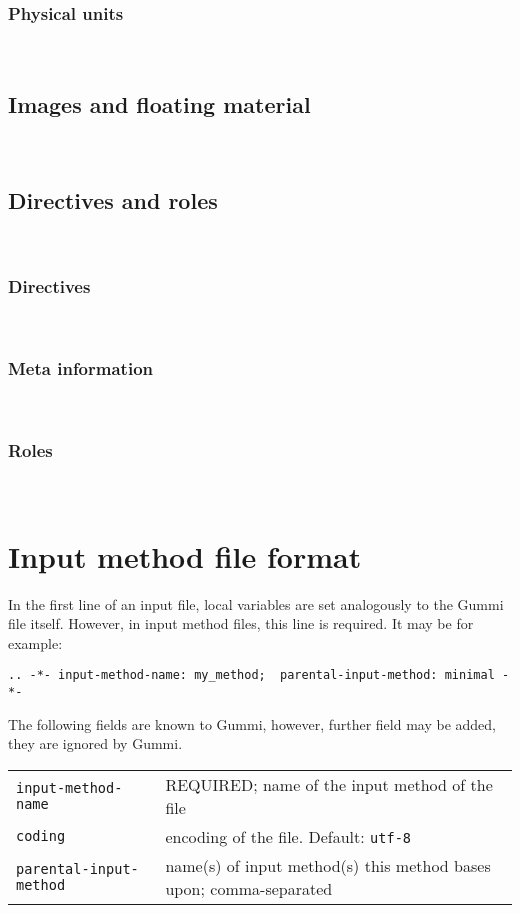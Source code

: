 \documentclass[12pt,openany]{book}
\begin{document}
~


\subsubsection{Physical units}

~

\subsection{Images and floating material}


~

\subsection{Directives and roles}

~

\subsubsection{Directives}

~

\subsubsection{Meta information}

~

\subsubsection{Roles}

~


\section{Input method file format}

In the first line of an input file, local variables are set analogously to the
Gummi file itself.  However, in input method files, this line is required.  It
may be for example:

\begin{lstlisting}
.. -*- input-method-name: my_method;  parental-input-method: minimal -*-
\end{lstlisting}

The following fields are known to Gummi, however, further field may be added,
they are ignored by Gummi.

\begin{center}
\begin{tabular}{@{}lp{7cm}@{}}
  \toprule
  \verb|input-method-name| & REQUIRED; name of the input method of the file \\
  \verb|coding| & encoding of the file.  Default: \verb|utf-8|\\
  \verb|parental-input-method| & name(s) of input method(s) this method bases
  upon; comma-separated\\
  \bottomrule
\end{tabular}
\end{center}
\end{document}
